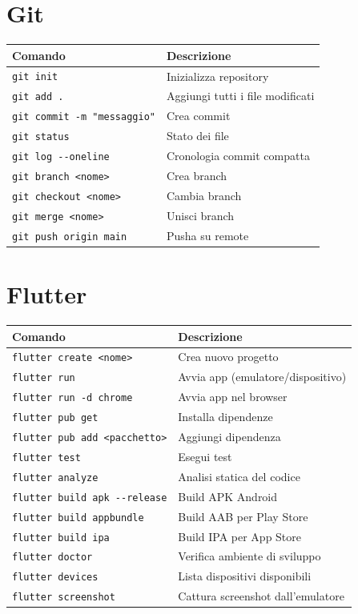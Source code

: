 \section{Git}

\begin{center}
\begin{tabularx}{\textwidth}{l X}
\toprule
\textbf{Comando} & \textbf{Descrizione} \\
\midrule
\texttt{git init} & Inizializza repository \\
\texttt{git add .} & Aggiungi tutti i file modificati \\
\texttt{git commit -m "messaggio"} & Crea commit \\
\texttt{git status} & Stato dei file \\
\texttt{git log -{}-oneline} & Cronologia commit compatta \\
\texttt{git branch <nome>} & Crea branch \\
\texttt{git checkout <nome>} & Cambia branch \\
\texttt{git merge <nome>} & Unisci branch \\
\texttt{git push origin main} & Pusha su remote \\
\bottomrule
\end{tabularx}
\end{center}

\section{Flutter}

\begin{center}
\begin{tabularx}{\textwidth}{l X}
\toprule
\textbf{Comando} & \textbf{Descrizione} \\
\midrule
\texttt{flutter create <nome>} & Crea nuovo progetto \\
\texttt{flutter run} & Avvia app (emulatore/dispositivo) \\
\texttt{flutter run -d chrome} & Avvia app nel browser \\
\texttt{flutter pub get} & Installa dipendenze \\
\texttt{flutter pub add <pacchetto>} & Aggiungi dipendenza \\
\texttt{flutter test} & Esegui test \\
\texttt{flutter analyze} & Analisi statica del codice \\
\texttt{flutter build apk -{}-release} & Build APK Android \\
\texttt{flutter build appbundle} & Build AAB per Play Store \\
\texttt{flutter build ipa} & Build IPA per App Store \\
\texttt{flutter doctor} & Verifica ambiente di sviluppo \\
\texttt{flutter devices} & Lista dispositivi disponibili \\
\texttt{flutter screenshot} & Cattura screenshot dall'emulatore \\
\bottomrule
\end{tabularx}
\end{center}

